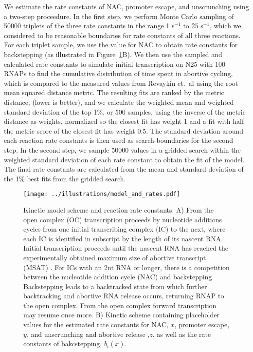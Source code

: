 We estimate the rate constants of NAC, promoter escape, and unscrunching using
a two-step proceedure. In the first step, we perform Monte Carlo sampling of
50000 triplets of the three rate constants in the range 1 s$^{-1}$ to 25
s$^{-1}$, which we considered to be reasonable boundaries for rate constants
of all three reactions. For each triplet sample, we use the value for NAC to
obtain rate constants for backstepping (as illustrated in
Figure~\ref{fig:model_and_rates}B). We then use the sampled and calculated
rate constants to simulate initial transcription on N25 with 100 RNAPs to
find the cumulative distribution of time spent in abortive cycling, which is
compared to the measured values from Revaykin et.\ al
\cite{revyakin_abortive_2006} using the root mean squared distance metric. The
resulting fits are ranked by the metric distance, (lower is better), and we
calculate the weighted mean and weighted standard deviation of the top 1\%, or
500 samples, using the inverse of the metric distance as weights, normalized
so the closest fit has weight 1 and a fit with half the metric score of the
closest fit has weight 0.5. The standard deviation around each reaction rate
constants is then used as search-boundaries for the second step. In the second
step, we sample 50000 values in a gridded search within the weighted standard
deviation of each rate constant to obtain the fit of the model. The final rate
constants are calculated from the mean and standard deviation of the 1\% best
fits from the gridded search.

\begin{figure}
	\begin{center}
        \texttt{[image: ../illustrations/model\_and\_rates.pdf]}
	\end{center}
    \caption{Kinetic model scheme and reaction rate constants. A) From the
    open complex (OC) transcription proceeds by nucleotide additions cycles
    from one initial transcribing complex (IC) to the next, where each IC is
    identified in subscript by the length of its nascent RNA. Initial
    transcription proceeds until the nascent RNA has reached the
    experimentally obtained maximum size of abortive transcript (MSAT)
    \cite{hsu_initial_2006}. For ICs with an 2nt RNA or longer, there is a
    competition between the nucleotide addition cycle (NAC) and backstepping.
    Backstepping leads to a backtracked state from which further backtracking
    and abortive RNA release occurs, returning RNAP to the open complex. From
    the open complex forward transcription may resume once more. B) Kinetic
    scheme containing placeholder values for the estimated rate constants for
    NAC, $x$, promoter escape, $y$, and unscrunching and abortive release ,$z$,
    as well as the rate constants of bakcstepping, $b_i(x)$.}
    \label{fig:model_and_rates}
\end{figure}

